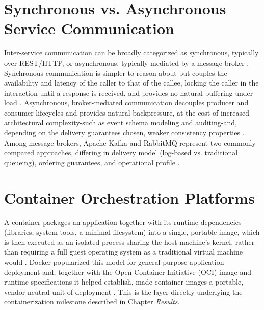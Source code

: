\documentclass[twoside]{supsistudent}
\begin{document}
\section{Synchronous vs. Asynchronous Service Communication}
Inter-service communication can be broadly categorized as synchronous, typically over REST/HTTP, or asynchronous, typically mediated by a message broker \cite{kazanavicius2023evaluation}. Synchronous communication is simpler to reason about but couples the availability and latency of the caller to that of the callee, locking the caller in the interaction until a response is received, and provides no natural buffering under load \cite{kazanavicius2023evaluation, magnoni2015modern}. Asynchronous, broker-mediated communication decouples producer and consumer lifecycles and provides natural backpressure, at the cost of increased architectural complexity-such as event schema modeling and auditing-and, depending on the delivery guarantees chosen, weaker consistency properties \cite{magnoni2015modern, kleppmann2017designing, laigner2024data}. Among message brokers, Apache Kafka and RabbitMQ represent two commonly compared approaches, differing in delivery model (log-based vs. traditional queueing), ordering guarantees, and operational profile \cite{fu2021fair, kleppmann2017designing}.

\section{Container Orchestration Platforms}
A container packages an application together with its runtime dependencies (libraries, system tools, a minimal filesystem) into a single, portable image, which is then executed as an isolated process sharing the host machine's kernel, rather than requiring a full guest operating system as a traditional virtual machine would \cite{soltesz2007container, felter2015updated}. Docker popularized this model for general-purpose application deployment and, together with the Open Container Initiative (OCI) image and runtime specifications it helped establish, made container images a portable, vendor-neutral unit of deployment \cite{merkel2014docker, oci-image-spec, oci-runtime-spec}. This is the layer directly underlying the containerization milestone described in Chapter \emph{Results}.
\end{document}

